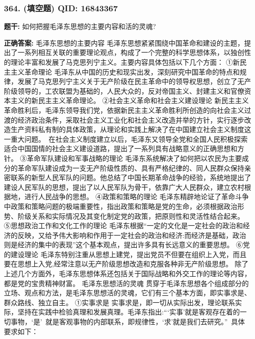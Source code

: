 \documentclass[12pt,UTF8]{ctexart}
\begin{document}
\vspace{0.3em}\hrulefill\vspace{0.7em}

\subsubsection*{364. (填空题) \small QID: 16843367}

\textbf{题干:}
如何把握毛泽东思想的主要内容和活的灵魂?

\textbf{正确答案:}
毛泽东思想的主要内容
毛泽东思想紧紧围绕中国革命和建设的主题，提出了一系列相互关联的重要理论观点，构成了一个完整的科学思想体系，以独创性的理论丰富和发展了马克思列宁主义。主要内容具体包括以下几个方面：
①新民主主义革命理论
毛泽东从中国的历史和现实出发，深刻研究中国革命的特点和规律，发展了马克思列宁主义关于无产阶级在民主革命中的领导权思想，创立了无产阶级领导的，工农联盟为基础的，人民大众的，反对帝国主义、封建主义和官僚资本主义的新民主主义革命理论。
②社会主义革命和社会主义建设理论
新民主主义革命胜利后，毛泽东领导我们党，依据新民主主义革命胜利所创造的向社会主义过渡的经济政治条件，采取社会主义工业化和社会主义改造并举的方针，实行逐步改造生产资料私有制的具体政策，从理论和实践上解决了在中国建立社会主义制度这一重大问题。 在社会主义制度建立以后，毛泽东又领导全党和全国人民积极探索适合中国国情的社会主义建设道路，提出了一系列具有战略意义的正确思想和方针。
③革命军队建设和军事战略的理论
毛泽东系统解决了如何把以农民为主要成分的革命军队建设成为一支无产阶级性质的、具有严格纪律的、同人民群众保持亲密联系的新型人民军队的问题。他总结了中国长期革命战争的经验，系统地提出了建设人民军队的思想，提出了以人民军队为骨干，依靠广大人民群众，建立农村根据地，进行人民战争的思想。
④政策和策略的理论
毛泽东精辟地论证了革命斗争中政策和策略问题的极端重要性，指出政策和策略是党的生命，必须根据政治形势、阶级关系和实际情况及其变化制定党的政策，把原则性和灵活性结合起来。
⑤思想政治工作和文化工作的理论
毛泽东根据“一定的文化是一定社会的政治和经济的反映，又给予伟大影响和作用于一定社会的政治和经济:而经济是基础，政治则是经济的集中的表现”这个基本观点，提出许多具有长远意义的重要思想。
⑥党的建设理论
毛泽东特别注重从思想上建党，提出党员不但要在组织上入党，而且要在思想上入党,经常注意以无产阶级思想改造和克服各种非无产阶级思想。
除了上述几个方面外，毛泽东思想体系还包括关于国际战略和外交工作的理论等内容，都是党的宝贵精神财富。
毛泽东思想活的灵魂
贯穿于毛泽东思想各个组成部分的立场、观点和方法，是毛泽东思想活的灵魂，它们有三个基本方面，即实事求是、群众路线、独立自主。
①实事求是
实事求是，即一切从实际出发，理论联系实际，坚持在实践中检验真理和发展真理。毛泽东指出:“‘实事’就是客观存在着的一切事物，‘是’ 就是客观事物的内部联系，即规律性，‘求’就是我们去研究。” 具体要求如下：
\end{document}
